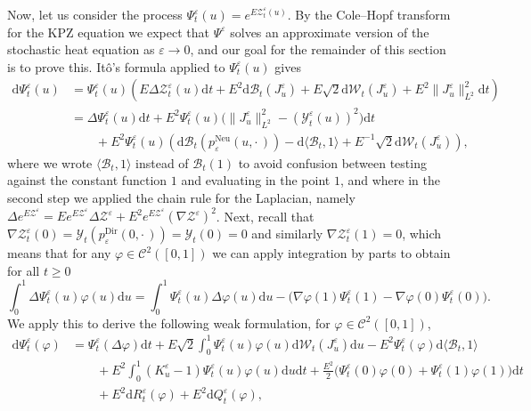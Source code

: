 \documentclass[AHL,Unicode,longabstracts]{cedram}
\DeclareMathOperator{\Dir}{Dir}
\DeclareMathOperator{\Neu}{Neu}
\newcommand{\mc}[1]{{\mathcal #1}}
\renewcommand{\mc}[1]{{\mathcal #1}}
\renewcommand{\geq}{\geqslant}
\newcommand*{\dd}{\mathrm{d}}
\newcommand*{\dt}{\dd t}
\newcommand*{\du}{\dd u}
\begin{document}
Now, let us consider the process $\Psi^{\varepsilon}_t (u) = e^{E \mc Z^{\varepsilon}_t (u)}$. By the Cole--Hopf transform for the KPZ equation we expect that $\Psi^\varepsilon$ solves an approximate version of the stochastic heat equation as $\varepsilon \to 0$, and our goal for the remainder of this section is to prove this. It\^o's formula applied to $\Psi_t^\varepsilon(u)$ gives
\begin{align*}
\dd \Psi^{\varepsilon}_t (u) & = \Psi^{\varepsilon}_t (u) \left(E
\Delta \mc Z^{\varepsilon}_t (u) \dt + E^2 \dd \mathcal{B}_t (J^{\varepsilon}_u) + E \sqrt{2} \dd\mc W_t (J^{\varepsilon}_u) + E^2 \| J^{\varepsilon}_u \|_{L^2}^2 \dt \right)\\
& = \Delta \Psi^{\varepsilon}_t (u) \dt + E^2
\Psi^{\varepsilon}_t (u) \big(\| J^{\varepsilon}_u \|_{L^2}^2 - (\mc Y^{\varepsilon}_t (u))^2\big) \dt \\
&\qquad + E^2 \Psi^{\varepsilon}_t (u) \left(\dd \mathcal{B}_t(p^{\Neu}_\varepsilon(u,\cdot\,)) - \dd \langle \mathcal{B}_t, 1 \rangle + E^{- 1} \sqrt{2} \dd\mc W_t (J^{\varepsilon}_u)\right),
\end{align*}
where we wrote $\langle \mathcal{B}_t, 1 \rangle$ instead of $\mathcal{B}_t (1)$ to avoid confusion between testing against the constant function $1$ and evaluating in the point $1$, and where in the second step we applied the chain rule for the Laplacian, namely $\Delta e^{E\mc Z^\varepsilon} = E e^{E\mc Z^\varepsilon} \Delta \mc Z^\varepsilon + E^2 e^{E\mc Z^\varepsilon} (\nabla \mc Z^\varepsilon)^2$. Next, recall that $\nabla\mc Z^{\varepsilon}_t (0) = \mc Y_t(p_\varepsilon^{\Dir}(0,\cdot\,)) = \mc Y_t(0) = 0$ and similarly $\nabla \mc Z^{\varepsilon}_t (1) = 0$, which means that for any $\varphi \in \mc C^2 ([0, 1])$ we can apply integration by parts to obtain for all $t \geq 0$
\[
\int_0^1 \Delta \Psi^{\varepsilon}_t (u) \varphi (u) \du = \int_0^1 \Psi^{\varepsilon}_t (u) \Delta \varphi (u) \du - \big(\nabla
\varphi (1) \Psi^{\varepsilon}_t (1) - \nabla \varphi (0)
\Psi^{\varepsilon}_t (0)\big).
\]
We apply this to derive the following weak formulation, for $\varphi \in \mc C^2 ([0, 1])$,
\begin{align*}
\dd \Psi^{\varepsilon}_t (\varphi) & = \Psi^{\varepsilon}_t (\Delta \varphi) \dt + E \sqrt{2}\int_0^1 \Psi^{\varepsilon}_t (u) \varphi (u) \dd\mc W_t (J^{\varepsilon}_u) \du - E^2 \Psi^{\varepsilon}_t (\varphi) \dd \langle \mathcal{B}_t, 1 \rangle\\
&\qquad + E^2 \int_0^1 (K^{\varepsilon}_u - 1)\Psi^{\varepsilon}_t (u)\varphi (u) \du \dt + \frac{E^2}{2} \big(\Psi^\varepsilon_t(0)\varphi(0) + \Psi^\varepsilon_t(1)\varphi(1)\big)\dt \\
&\qquad + E^2 \dd R^{\varepsilon}_t (\varphi) + E^2 \dd Q^{\varepsilon}_t (\varphi),\phantom{\frac11}
\end{align*}
\end{document}
